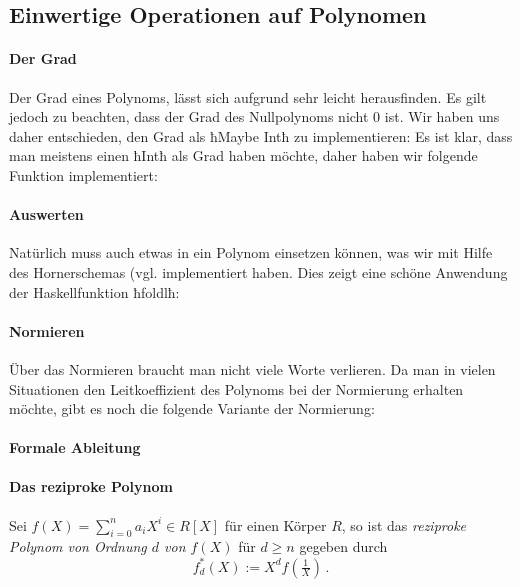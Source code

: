\subsection{Einwertige Operationen auf Polynomen}

\paragraph{Der Grad} Der Grad eines Polynoms, lässt sich aufgrund 
 sehr leicht herausfinden. Es gilt jedoch zu beachten, dass der
Grad des Nullpolynoms nicht $0$ ist. Wir haben uns daher entschieden, den Grad
als ħMaybe Intħ zu implementieren:
Es ist klar, dass man meistens einen ħIntħ als Grad haben möchte, daher haben
wir folgende Funktion implementiert:

\paragraph{Auswerten} Natürlich muss auch etwas in ein Polynom einsetzen
können, was wir mit Hilfe des Hornerschemas (vgl. \autocite{wiki:horner-schema}
implementiert haben. Dies zeigt eine schöne Anwendung der Haskellfunktion 
ħfoldlħ:


\paragraph{Normieren} Über das Normieren braucht man nicht viele Worte
verlieren.
Da man in vielen Situationen den Leitkoeffizient des Polynoms bei der
Normierung erhalten möchte, gibt es noch die folgende Variante der Normierung:

\paragraph{Formale Ableitung} 

\paragraph{Das reziproke Polynom} 
\begin{definition}
  Sei $f(X) = \sum_{i=0}^n a_i X^i \in R[X]$ für einen Körper $R$, so ist 
  das \emph{reziproke Polynom von Ordnung $d$ von $f(X)$} für $d \geq n$ 
  gegeben durch
  \[ f^\ast_d(X) := X^d f(\tfrac{1}{X})\,.\]
\end{definition}

